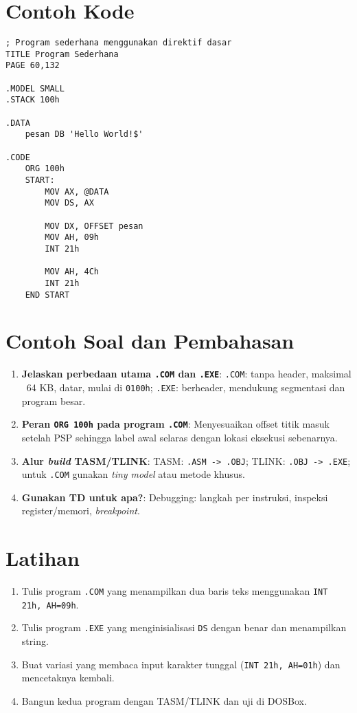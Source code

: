 \documentclass[../main.tex]{subfiles}
\begin{document}
\section{Contoh Kode}
\begin{verbatim}
; Program sederhana menggunakan direktif dasar
TITLE Program Sederhana
PAGE 60,132

.MODEL SMALL
.STACK 100h

.DATA
    pesan DB 'Hello World!$'

.CODE
    ORG 100h
    START:
        MOV AX, @DATA
        MOV DS, AX
        
        MOV DX, OFFSET pesan
        MOV AH, 09h
        INT 21h
        
        MOV AH, 4Ch
        INT 21h
    END START
\end{verbatim}

\section{Contoh Soal dan Pembahasan}
\begin{enumerate}
  \item \textbf{Jelaskan perbedaan utama \texttt{.COM} dan \texttt{.EXE}}: \texttt{.COM}: tanpa header, maksimal ~64 KB, datar, mulai di \texttt{0100h}; \texttt{.EXE}: berheader, mendukung segmentasi dan program besar.
  \item \textbf{Peran \texttt{ORG 100h} pada program \texttt{.COM}}: Menyesuaikan offset titik masuk setelah PSP sehingga label awal selaras dengan lokasi eksekusi sebenarnya.
  \item \textbf{Alur \textit{build} TASM/TLINK}: TASM: \texttt{.ASM -> .OBJ}; TLINK: \texttt{.OBJ -> .EXE}; untuk \texttt{.COM} gunakan \textit{tiny model} atau metode khusus.
  \item \textbf{Gunakan TD untuk apa?}: Debugging: langkah per instruksi, inspeksi register/memori, \textit{breakpoint}.
\end{enumerate}

\section{Latihan}
\begin{enumerate}
  \item Tulis program \texttt{.COM} yang menampilkan dua baris teks menggunakan \texttt{INT 21h, AH=09h}.
  \item Tulis program \texttt{.EXE} yang menginisialisasi \texttt{DS} dengan benar dan menampilkan string.
  \item Buat variasi yang membaca input karakter tunggal (\texttt{INT 21h, AH=01h}) dan mencetaknya kembali.
  \item Bangun kedua program dengan TASM/TLINK dan uji di DOSBox.
\end{enumerate}
\end{document}
